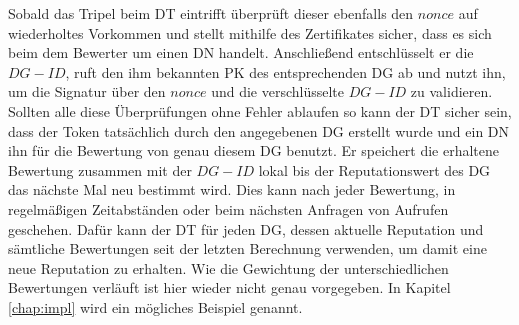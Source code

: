 \documentclass[
	fontsize=11pt,
	headings=small,
	parskip=half,           %
	bibliography=totoc,
	numbers=noenddot,       %
	open=any,               %
]{scrreprt}
\begin{document}
Sobald das Tripel beim DT eintrifft überprüft dieser ebenfalls den $nonce$ auf wiederholtes Vorkommen und stellt mithilfe des Zertifikates sicher, dass es sich beim dem Bewerter um einen DN handelt. Anschließend entschlüsselt er die $DG-ID$, ruft den ihm bekannten PK des entsprechenden DG ab und nutzt ihn, um die Signatur über den $nonce$ und die verschlüsselte $DG-ID$ zu validieren. Sollten alle diese Überprüfungen ohne Fehler ablaufen so kann der DT sicher sein, dass der Token tatsächlich durch den angegebenen DG erstellt wurde und ein DN ihn für die Bewertung von genau diesem DG benutzt. Er speichert die erhaltene Bewertung zusammen mit der $DG-ID$ lokal bis der Reputationswert des DG das nächste Mal neu bestimmt wird. Dies kann nach jeder Bewertung, in regelmäßigen Zeitabständen oder beim nächsten Anfragen von Aufrufen geschehen. Dafür kann der DT für jeden DG, dessen aktuelle Reputation und sämtliche Bewertungen seit der letzten Berechnung verwenden, um damit eine neue Reputation zu erhalten. Wie die Gewichtung der unterschiedlichen Bewertungen verläuft ist hier wieder nicht genau vorgegeben. In Kapitel \ref{chap:impl} wird ein mögliches Beispiel genannt.
\end{document}
